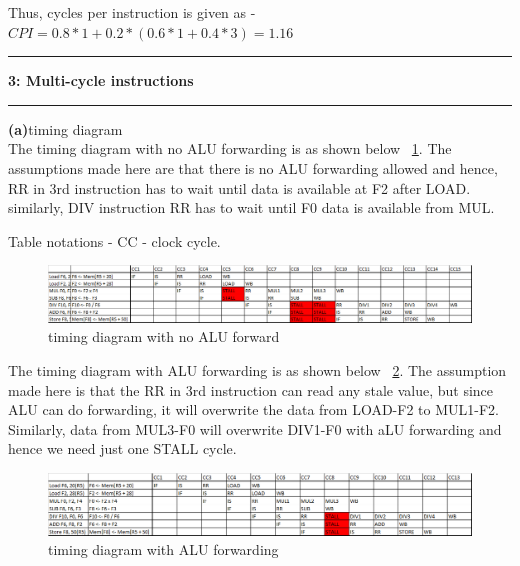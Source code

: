 \documentclass[11pt]{article}
\newcommand\question[2]{\vspace{.25in}\hrule\textbf{#1: #2}\vspace{.5em}\hrule\vspace{.10in}}
\renewcommand\part[1]{\vspace{.10in}\textbf{(#1)}}
\begin{document}
Thus, cycles per instruction is given as -
$CPI = 0.8*1 + 0.2*(0.6*1 + 0.4*3) = 1.16$ 

\question{3}{Multi-cycle instructions}

\part{a}{timing diagram}\\
The timing diagram with no ALU forwarding is as shown below ~\ref{no_fwd}. The assumptions made here are that there is no ALU forwarding allowed and hence, RR in 3rd instruction has to wait until data is available at F2 after LOAD. similarly, DIV instruction RR has to wait until F0 data is available from MUL.

Table notations - CC - clock cycle.
\begin{figure}[ht]
	\begin{center}
	\includegraphics[scale = 0.60]{no_fwd}
	\end{center}
	\vspace{-4ex}
	\caption{timing diagram with no ALU forward}
	\label{no_fwd}
	\vspace{-3ex}
\end{figure}


The timing diagram with ALU forwarding is as shown below ~\ref{alu_fwd}. The assumption made here is that the RR in 3rd instruction can read any stale value, but since ALU can do forwarding, it will overwrite the data from LOAD-F2 to MUL1-F2. Similarly, data from MUL3-F0 will overwrite DIV1-F0 with aLU forwarding and hence we need just one STALL cycle.
\begin{figure}[ht]
	\begin{center}
	\includegraphics[scale = 0.60]{alu_fwd}
	\end{center}
	\vspace{-4ex}
	\caption{timing diagram with ALU forwarding}
	\label{alu_fwd}
	\vspace{-3ex}
\end{figure}
\end{document}

